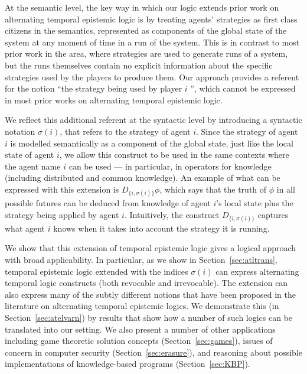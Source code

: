 \documentclass[a4wide]{article}
\theoremstyle{examplesty}
\newcommand{\strat}{\sigma}
\begin{document}
At the semantic level, the key way in which our logic extends prior work on alternating temporal epistemic logic is by treating 
agents' strategies as first class citizens in the semantics, 
represented as components of the global state of the system at any
moment of time
in a run of the system.  
This is in contrast to 
most prior work 
in the area, where 
strategies are used to generate runs of a system, but the runs
themselves contain no explicit information about the specific strategies used
by the players to produce them. 
Our approach provides a referent for the notion ``the strategy being used by player $i$ '', 
which cannot be expressed in most prior works on alternating temporal epistemic logic. 


We reflect this additional referent at the syntactic level by 
introducing a syntactic notation $\sigma(i)$, that refers to the strategy of agent $i$. 
Since the strategy of agent $i$ is modelled semantically as a component of the global state, 
just like the local state of agent $i$, 
we allow this construct to be used in the same contexts where the agent name $i$ can be used
--- in particular, in operators for knowledge (including distributed and common knowledge). 
An example of what can be expressed with this extension is $D_{\{i,\strat(i)\}} \phi$, which says
that the truth of $\phi$ in all possible futures can be deduced from knowledge of agent $i$'s local state plus the  
strategy being applied by agent $i$. Intuitively, the construct $D_{\{i,\strat(i)\}} $ captures what agent $i$ knows
when it takes into account the strategy it is running.  

We show that 
this 
extension of temporal epistemic logic 
gives a logical approach with broad applicability. 
In particular, 
as we show in Section~\ref{sec:atltrans}, temporal epistemic logic extended with the
indices $\strat(i)$ can express alternating temporal logic constructs 
(both revocable and irrevocable). 
The extension can also 
express many of the subtly different notions that have been 
proposed in the literature on 
alternating temporal epistemic logics. We demonstrate
this 
(in Section~\ref{sec:atelvarn})
by results that show how 
a number of 
such logics can be translated into our setting. 
We also present a number of other 
applications 
including
game theoretic  solution concepts (Section~\ref{sec:games}), 
issues of concern in computer security (Section~\ref{sec:erasure}), 
and  reasoning about 
possible implementations of knowledge-based programs (Section~\ref{sec:KBP}). 
\end{document}
